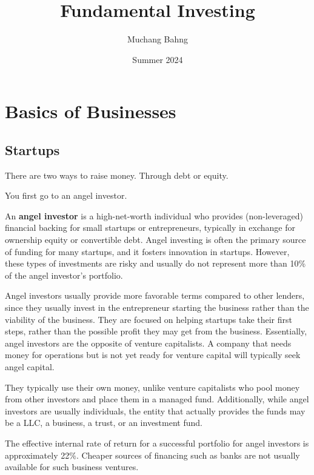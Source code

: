 \documentclass{article}
\begin{document}
\title{Fundamental Investing}
\author{Muchang Bahng}
\date{Summer 2024}

\maketitle
\tableofcontents
\pagebreak

\section{Basics of Businesses}

  \subsection{Startups}

    There are two ways to raise money. Through debt or equity. 

    You first go to an angel investor. 

    \begin{definition}
      An \textbf{angel investor} is a high-net-worth individual who provides (non-leveraged) financial backing for small startups or entrepreneurs, typically in exchange for ownership equity or convertible debt. Angel investing is often the primary source of funding for many startups, and it fosters innovation in startups. However, these types of investments are risky and usually do not represent more than 10\% of the angel investor's portfolio. 

      Angel investors usually provide more favorable terms compared to other lenders, since they usually invest in the entrepreneur starting the business rather than the viability of the business. They are focused on helping startups take their first steps, rather than the possible profit they may get from the business. Essentially, angel investors are the opposite of venture capitalists. A company that needs money for operations but is not yet ready for venture capital will typically seek angel capital. 

      They typically use their own money, unlike venture capitalists who pool money from other investors and place them in a managed fund. Additionally, while angel investors are usually individuals, the entity that actually provides the funds may be a LLC, a business, a trust, or an investment fund. 

      The effective internal rate of return for a successful portfolio for angel investors is approximately 22\%. Cheaper sources of financing such as banks are not usually available for such business ventures. 
    \end{definition}
\end{document}
